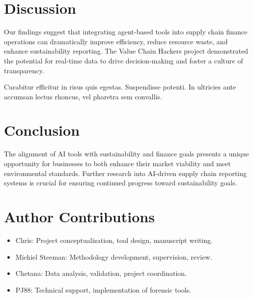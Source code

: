 \documentclass[
  oneside,
  open=any]{scrbook}
\providecommand{\tightlist}{%
  \setlength{\itemsep}{0pt}\setlength{\parskip}{0pt}}\usepackage{longtable,booktabs,array}
\begin{document}
\chapter{Discussion}\label{discussion}

Our findings suggest that integrating agent-based tools into supply
chain finance operations can dramatically improve efficiency, reduce
resource waste, and enhance sustainability reporting. The Value Chain
Hackers project demonstrated the potential for real-time data to drive
decision-making and foster a culture of transparency.

Curabitur efficitur in risus quis egestas. Suspendisse potenti. In
ultricies ante accumsan lectus rhoncus, vel pharetra sem convallis.

\chapter{Conclusion}\label{conclusion}

The alignment of AI tools with sustainability and finance goals presents
a unique opportunity for businesses to both enhance their market
viability and meet environmental standards. Further research into
AI-driven supply chain reporting systems is crucial for ensuring
continued progress toward sustainability goals.

\chapter{Author Contributions}\label{author-contributions}

\begin{itemize}
\tightlist
\item
  Chris: Project conceptualization, tool design, manuscript writing.
\item
  Michiel Steeman: Methodology development, supervision, review.
\item
  Chetana: Data analysis, validation, project coordination.
\item
  PJ88: Technical support, implementation of forensic tools.
\end{itemize}


\backmatter
\end{document}
